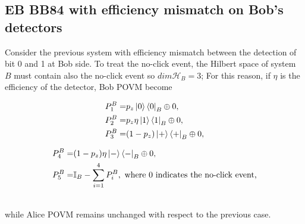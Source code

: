 \documentclass{article}
\begin{document}
    \subsection{EB BB84 with efficiency mismatch on Bob's detectors}
        Consider the previous system with efficiency mismatch between the detection of bit 0 and 1 at Bob side.
        To treat the no-click event, the Hilbert space of system \(B\) must contain also the no-click event so \(dim \mathcal{H}_B=3\);
        For this reason, if \(\eta\) is the efficiency of the detector, Bob POVM become 
        \\
        \begin{minipage}{.5\linewidth}
            \begin{align*}
                P^B_1 =& p_z \ket{0}\bra{0}_B\oplus 0,\\
                P^B_2 =& p_z\eta \ket{1}\bra{1}_B\oplus 0,\\
                P^B_3 =& (1-p_z) \ket{+}\bra{+}_B\oplus 0,
            \end{align*}
        \end{minipage}
        \begin{minipage}{.5\linewidth}
            \begin{align*}                
                P^B_4 =& (1-p_z)\eta \ket{-}\bra{-}_B\oplus 0,\\
                P^B_5 =& \mathbb{I}_B - \sum_{i=1}^4P^B_i, \text{ where 0 indicates the no-click event,}                
            \end{align*}
        \end{minipage}
        \\
        while Alice POVM remains unchanged with respect to the previous case.
\end{document}
